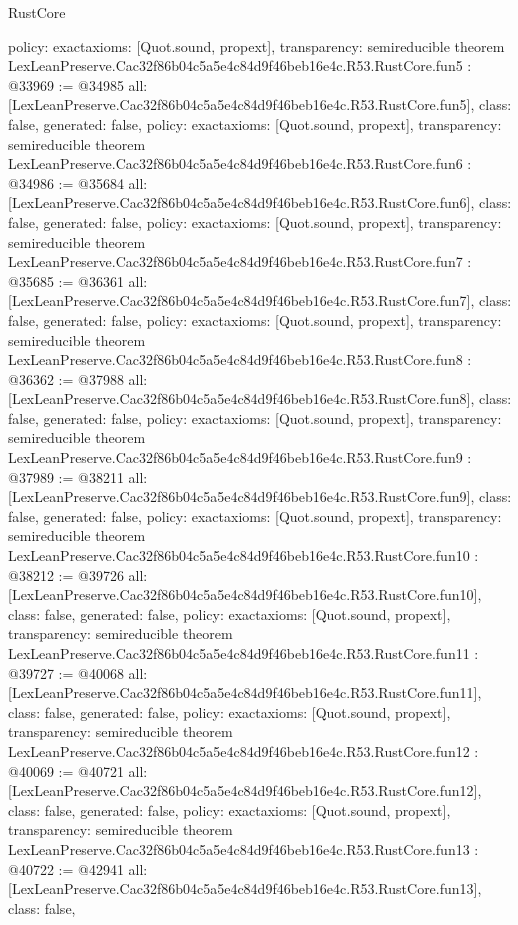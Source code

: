 \begin{lexlean}{RustCore}
\begin{coremodule}
{  policy: exact{axioms: [Quot.sound, propext]},
  transparency: semireducible
}
theorem LexLeanPreserve.Cac32f86b04c5a5e4c84d9f46beb16e4c.R53.RustCore.fun5 : @33969 := @34985 {
  all: [LexLeanPreserve.Cac32f86b04c5a5e4c84d9f46beb16e4c.R53.RustCore.fun5],
  class: false,
  generated: false,
  policy: exact{axioms: [Quot.sound, propext]},
  transparency: semireducible
}
theorem LexLeanPreserve.Cac32f86b04c5a5e4c84d9f46beb16e4c.R53.RustCore.fun6 : @34986 := @35684 {
  all: [LexLeanPreserve.Cac32f86b04c5a5e4c84d9f46beb16e4c.R53.RustCore.fun6],
  class: false,
  generated: false,
  policy: exact{axioms: [Quot.sound, propext]},
  transparency: semireducible
}
theorem LexLeanPreserve.Cac32f86b04c5a5e4c84d9f46beb16e4c.R53.RustCore.fun7 : @35685 := @36361 {
  all: [LexLeanPreserve.Cac32f86b04c5a5e4c84d9f46beb16e4c.R53.RustCore.fun7],
  class: false,
  generated: false,
  policy: exact{axioms: [Quot.sound, propext]},
  transparency: semireducible
}
theorem LexLeanPreserve.Cac32f86b04c5a5e4c84d9f46beb16e4c.R53.RustCore.fun8 : @36362 := @37988 {
  all: [LexLeanPreserve.Cac32f86b04c5a5e4c84d9f46beb16e4c.R53.RustCore.fun8],
  class: false,
  generated: false,
  policy: exact{axioms: [Quot.sound, propext]},
  transparency: semireducible
}
theorem LexLeanPreserve.Cac32f86b04c5a5e4c84d9f46beb16e4c.R53.RustCore.fun9 : @37989 := @38211 {
  all: [LexLeanPreserve.Cac32f86b04c5a5e4c84d9f46beb16e4c.R53.RustCore.fun9],
  class: false,
  generated: false,
  policy: exact{axioms: [Quot.sound, propext]},
  transparency: semireducible
}
theorem LexLeanPreserve.Cac32f86b04c5a5e4c84d9f46beb16e4c.R53.RustCore.fun10 : @38212 := @39726 {
  all: [LexLeanPreserve.Cac32f86b04c5a5e4c84d9f46beb16e4c.R53.RustCore.fun10],
  class: false,
  generated: false,
  policy: exact{axioms: [Quot.sound, propext]},
  transparency: semireducible
}
theorem LexLeanPreserve.Cac32f86b04c5a5e4c84d9f46beb16e4c.R53.RustCore.fun11 : @39727 := @40068 {
  all: [LexLeanPreserve.Cac32f86b04c5a5e4c84d9f46beb16e4c.R53.RustCore.fun11],
  class: false,
  generated: false,
  policy: exact{axioms: [Quot.sound, propext]},
  transparency: semireducible
}
theorem LexLeanPreserve.Cac32f86b04c5a5e4c84d9f46beb16e4c.R53.RustCore.fun12 : @40069 := @40721 {
  all: [LexLeanPreserve.Cac32f86b04c5a5e4c84d9f46beb16e4c.R53.RustCore.fun12],
  class: false,
  generated: false,
  policy: exact{axioms: [Quot.sound, propext]},
  transparency: semireducible
}
theorem LexLeanPreserve.Cac32f86b04c5a5e4c84d9f46beb16e4c.R53.RustCore.fun13 : @40722 := @42941 {
  all: [LexLeanPreserve.Cac32f86b04c5a5e4c84d9f46beb16e4c.R53.RustCore.fun13],
  class: false,
}
\end{coremodule}
\end{lexlean}
